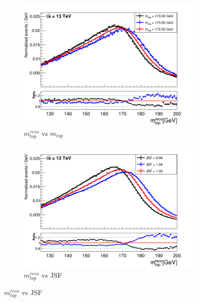\begin{landscape}
	

\begin{figure} %
	\centering 
	

	\begin{subfigure}{0.37\textwidth}
		\includegraphics[width=\linewidth]{Pics/PlotCombi/mtop_mtop.png}
		\caption{$m_{top}^{reco}$ vs $m_{top}$} \label{fig:mtopmtop}
	\end{subfigure}
	\hspace*{0.25cm}
	\begin{subfigure}{0.37\textwidth}
	\includegraphics[width=\linewidth]{Pics/PlotCombi/mtop_JSF.png}
	\caption{$m_{top}^{reco}$ vs JSF} \label{fig:mtopJSF}
	\end{subfigure}

\end{figure}
\end{landscape}

